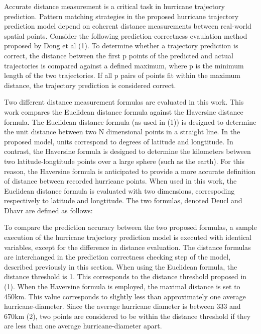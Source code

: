 \documentclass[conference]{IEEEtran}
\begin{document}


Accurate distance measurement is a critical task in hurricane trajectory prediction. Pattern matching strategies in the proposed hurricane trajectory prediction model depend on coherent distance measurements between real-world spatial points. Consider the following prediction-correctness evaulation method proposed by Dong et al (1). To determine whether a trajectory prediction is correct, the distance between the first p points of the predicted and actual trajectories is compared against a defined maximum, where p is the minimum length of the two trajectories. If all p pairs of points fit within the maximum distance, the trajectory prediction is considered correct. 

Two different distance measurement formulas are evaluated in this work. This work compares the Euclidean distance formula against the Haversine distance formula. The Euclidean distance formula (as used in (1)) is designed to determine the unit distance between two N dimensional points in a straight line. In the proposed model, units correspond to degrees of latitude and longtitude. In contrast, the Haversine formula is designed to determine the kilometers between two latitude-longtitude points over a large sphere (such as the earth). For this reason, the Haversine formula is anticipated to provide a more accurate definition of distance between recorded hurricane points. When used in this work, the Euclidean distance formula is evaluated with two dimensions, correspoding respectively to latitude and longtitude. The two formulas, denoted Deucl and Dhavr are defined as follows:





To compare the prediction accuracy between the two proposed formulas, a sample execution of the hurricane trajectory prediction model is executed with identical variables, except for the difference in distance evaluation. The distance formulas are interchanged in the prediction correctness checking step of the model, described previously in this section. When using the Euclidean formula, the distance threshold is 1. This corresponds to the distance threshold proposed in (1). When the Haversine formula is employed, the maximal distance is set to 450km. This value corresponds to slightly less than approximately one average hurricane-diameter. Since the average hurricane diameter is between 333 and 670km (2), two points are considered to be within the distance threshold if they are less than one average hurricane-diameter apart. 
\end{document}
